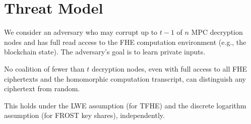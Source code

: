 \section{Threat Model}


We consider an adversary who may corrupt up to $t-1$ of $n$ MPC decryption nodes and has full read access to the FHE computation environment (e.g., the blockchain state). The adversary's goal is to learn private inputs.

\begin{definition}
No coalition of fewer than $t$ decryption nodes, even with full access to all FHE ciphertexts and the homomorphic computation transcript, can distinguish any ciphertext from random.
\end{definition}

This holds under the LWE assumption (for TFHE) and the discrete logarithm assumption (for FROST key shares), independently.


